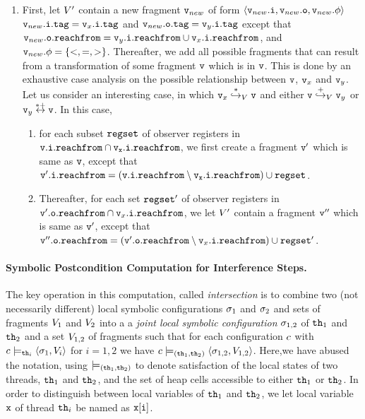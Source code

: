\begin{enumerate}
  \item
    First, let $V'$ contain a new fragment $\mathtt{v}_{new}$ of form
    $\left\langle\mathtt{v}_{new}.\mathtt{i},\mathtt{v}_{new}.\mathtt{o},\mathtt{v}_{new}.\phi\right\rangle$
    $\mathtt{v}_{new}.\mathtt{i}.\mathtt{tag} = \mathtt{v}_x.\mathtt{i}.\mathtt{tag}$ and $\mathtt{v}_{new}.\mathtt{o}.\mathtt{tag} = \mathtt{v}_y.\mathtt{i}.\mathtt{tag}$ except that $\mathtt{v}_{new}.\mathtt{o}.\mathtt{reachfrom} = \mathtt{v}_y.\mathtt{i}.\mathtt{reachfrom} \cup \mathtt{v}_x.\mathtt{i}.\mathtt{reachfrom}$,
    and $\mathtt{v}_{new}.\phi = \left\{<,=,>\right\}$.
Thereafter, we add all possible fragments that can result from a transformation
of some fragment $\mathtt{v}$ which is in $\mathtt{v}$. This is done by an exhaustive
case analysis on the possible
relationship between $\mathtt{v}$, $\mathtt{v}_x$ and $\mathtt{v}_y$.
Let us consider an interesting case, in which
$\mathtt{v}_x \overset{*}\hookrightarrow_{V} \mathtt{v}$ and either $\mathtt{v} \overset{+}\hookrightarrow_{V} \mathtt{v}_y$ or $\mathtt{v}_y \overset{*+}\leftrightarrow \mathtt{v}$.
In this case,
\begin{enumerate}
\item
  for each subset $\mathtt{regset}$ of observer registers in $\tt \mathtt{v}.\mathtt{i}.\mathtt{reachfrom} \cap \mathtt{v}_x.\mathtt{i}.\mathtt{reachfrom}$, we first create
  a fragment $\mathtt{v}'$ which is same as $\mathtt{v}$, except that $\mathtt{v}'.\mathtt{i}.\mathtt{reachfrom} = (\tt \mathtt{v}.\mathtt{i}.\mathtt{reachfrom} \setminus \mathtt{v}_x.\mathtt{i}.\mathtt{reachfrom}) \cup \mathtt{regset}$.
\item
  Thereafter, 
for each set $\mathtt{regset}'$ of observer registers in $\mathtt{v}'.\mathtt{o}.\mathtt{reachfrom} \cap \mathtt{v}_x.\mathtt{i}.\mathtt{reachfrom}$,  we let $V'$ contain a fragment
$\mathtt{v}''$ which is same as $\mathtt{v}'$, except that $\mathtt{v}''.\mathtt{o}.\mathtt{reachfrom} = (\mathtt{v}'.\mathtt{o}.\mathtt{reachfrom} \setminus \mathtt{v}_x.\mathtt{i}.\mathtt{reachfrom}) \cup \mathtt{regset}'$. 
\end{enumerate}
\end{enumerate}

\paragraph{Symbolic Postcondition Computation for Interference Steps.} 
The key operation in this computation, called {\em intersection}
is to combine two (not necessarily different) local symbolic configurations
$\sigma_1$ and $\sigma_2$ and sets of fragments
$V_1$ and $V_2$ into a
a {\em joint local symbolic configuration} $\sigma_{1,2}$ of
${\tt th}_1$ and ${\tt th}_2$ and a set $V_{1,2}$ of fragments such that
for each configuration $c$ with
$c \models_{{\tt th}_i} \left\langle\sigma_1,V_i\right\rangle$ for $i=1,2$ we have
$c \models_{({\tt th}_1,{\tt th}_2)} \left\langle\sigma_{1,2},V_{1,2}\right\rangle$. Here,we have abused the notation, using
$\models_{({\tt th}_1,{\tt th}_2)}$ to denote satisfaction of the local states of
two threads, ${\tt th}_1$ and ${\tt th}_2$, and the set of heap cells accessible to
either ${\tt th}_1$ or ${\tt th}_2$.
In order to distinguish
between local variables of ${\tt th}_1$ and ${\tt th}_2$, we let local variable
$\mathtt{x}$ of thread ${\tt th}_i$ be named as $\mathtt{x[i]}$.

